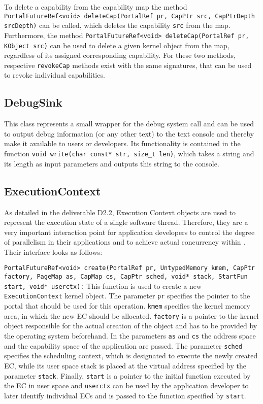 To delete a capability from the capability map the method
\texttt{PortalFutureRef<void> deleteCap(PortalRef pr, CapPtr src, CapPtrDepth
srcDepth)} can be called, which deletes the capability \texttt{src} from the
map. Furthermore, the method \texttt{PortalFutureRef<void> deleteCap(PortalRef
pr, KObject src)} can be used to delete a given kernel object from the map,
regardless of its assigned corresponding capability. For these two methods,
respective \texttt{revokeCap} methods exist with the same signatures, that can
be used to revoke individual capabilities.

\subsection{DebugSink}
This class represents a small wrapper for the debug system call and can be used
to output debug information (or any other text) to the text console and thereby
make it available to users or developers. Its functionality is contained in the
function \texttt{void write(char const* str, size\_t len)}, which takes a string
and its length as input parameters and outputs this string to the console.

\subsection{ExecutionContext}
As detailed in the deliverable D2.2, Execution Context objects are used to
represent the execution state of a single software thread. Therefore, they are a
very important interaction point for application developers to control the
degree of parallelism in their applications and to achieve actual concurrency
within \mythos. Their interface looks as follows:

\texttt{PortalFutureRef<void> create(PortalRef pr, UntypedMemory kmem,
CapPtr factory, PageMap as, CapMap cs, CapPtr sched, void* stack, StartFun
start, void* userctx):}
This function is used to create a new \texttt{ExecutionContext} kernel object.
The parameter \texttt{pr} specifies the pointer to the portal that should be
used for this operation. \texttt{kmem} specifies the kernel memory area, in
which the new EC should be allocated. \texttt{factory} is a pointer to the
kernel object responsible for the actual creation of the object and has to be
provided by the operating system beforehand. In the parameters \texttt{as} and
\texttt{cs} the address space and the capability space of the application are
passed. The parameter \texttt{sched} specifies the scheduling context, which is
designated to execute the newly created EC, while its user space stack is placed
at the virtual address specified by the parameter \texttt{stack}. Finally,
\texttt{start} is a pointer to the initial function  executed by the EC in user
space and \texttt{userctx} can be used by the application developer to later
identify individual ECs and is passed to the function specified by
\texttt{start}.


